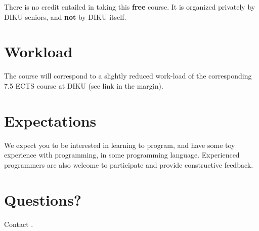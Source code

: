 \vspace{0.05in}

There is no credit entailed in taking this {\bf free} course.
It is organized privately by DIKU seniors, and {\bf not} by DIKU itself.

\vspace{0.15in}

\section*{Workload}

\vspace{0.05in}


The course will correspond to a slightly reduced work-load of the corresponding
7.5 ECTS course at DIKU (see link in the margin).

\vspace{0.15in}

\section*{Expectations}

\vspace{0.05in}

We expect you to be interested in learning to program, and have some toy
experience with programming, in some programming language. Experienced
programmers are also welcome to participate and provide constructive feedback.

\vspace{0.15in}

\section*{Questions?}

\vspace{0.05in}

Contact .
